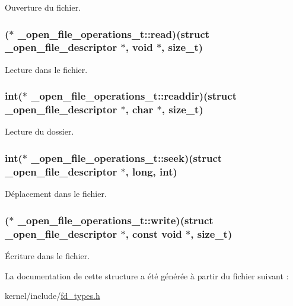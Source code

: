 Ouverture du fichier. \hypertarget{struct__open__file__operations__t_ad5637bc6a752b9a13806748966b77e68}{
\subsubsection[{read}]{($\ast$ \+\_\+open\+\_\+file\+\_\+operations\+\_\+t\+::read)(struct {\bf \+\_\+open\+\_\+file\+\_\+descriptor} $\ast$, void $\ast$, {\bf size\+\_\+t})}}\label{struct__open__file__operations__t_ad5637bc6a752b9a13806748966b77e68}
Lecture dans le fichier. \hypertarget{struct__open__file__operations__t_a7cdb4947735c5559610fb8be2472791d}{
\subsubsection[{readdir}]{\setlength{\rightskip}{0pt plus 5cm}int($\ast$ \+\_\+open\+\_\+file\+\_\+operations\+\_\+t\+::readdir)(struct {\bf \+\_\+open\+\_\+file\+\_\+descriptor} $\ast$, char $\ast$, {\bf size\+\_\+t})}}\label{struct__open__file__operations__t_a7cdb4947735c5559610fb8be2472791d}
Lecture du dossier. \hypertarget{struct__open__file__operations__t_ac45e5e3400e4cd9756b5784289744cc7}{
\subsubsection[{seek}]{\setlength{\rightskip}{0pt plus 5cm}int($\ast$ \+\_\+open\+\_\+file\+\_\+operations\+\_\+t\+::seek)(struct {\bf \+\_\+open\+\_\+file\+\_\+descriptor} $\ast$, long, int)}}\label{struct__open__file__operations__t_ac45e5e3400e4cd9756b5784289744cc7}
Déplacement dans le fichier. \hypertarget{struct__open__file__operations__t_ae730a8e7e44c3b3168b9f091c334b337}{
\subsubsection[{write}]{($\ast$ \+\_\+open\+\_\+file\+\_\+operations\+\_\+t\+::write)(struct {\bf \+\_\+open\+\_\+file\+\_\+descriptor} $\ast$, const void $\ast$, {\bf size\+\_\+t})}}\label{struct__open__file__operations__t_ae730a8e7e44c3b3168b9f091c334b337}
Écriture dans le fichier. 

La documentation de cette structure a été générée à partir du fichier suivant \+:\begin{DoxyCompactItemize}
\item 
kernel/include/\hyperlink{fd__types_8h}{fd\+\_\+types.\+h}\end{DoxyCompactItemize}
